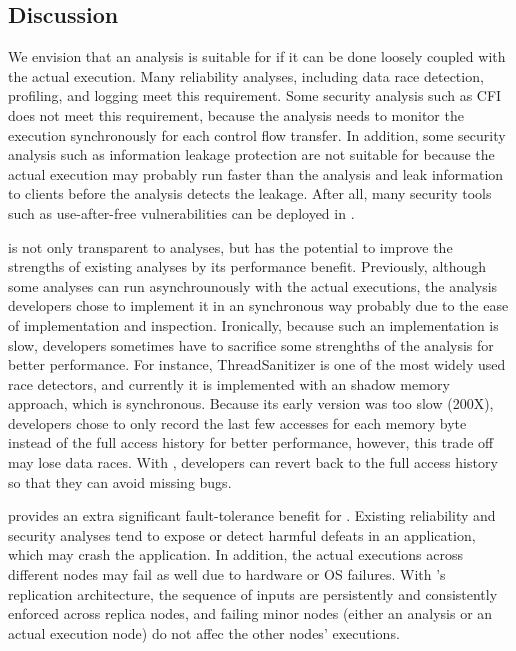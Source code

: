 
\subsection{Discussion} \label{sec:discuss}

We envision that an analysis is suitable for \xxx if it can be done loosely 
coupled with the actual execution. Many reliability analyses, including data 
race detection, profiling, and logging meet this requirement. Some security 
analysis such as CFI does not meet this requirement, because the analysis needs 
to monitor the execution synchronously for each control flow transfer. In 
addition, some security analysis such as information leakage protection are not 
suitable for \xxx because the actual execution may probably run faster than the 
analysis and leak information to clients before the analysis detects the 
leakage. After all, many security tools such as use-after-free vulnerabilities 
can be deployed in \xxx.

\xxx is not only transparent to analyses, but has the potential to improve the 
strengths of existing analyses by its performance benefit. Previously, although 
some analyses can run asynchrounously with the actual executions, the analysis 
developers chose to implement it in an synchronous way probably due to the ease 
of implementation and inspection. Ironically, because such an implementation is 
slow, developers sometimes have to sacrifice some strenghths of the analysis 
for better performance. For instance, ThreadSanitizer is one of the most widely 
used race detectors, and currently it is implemented with an shadow memory 
approach, which is synchronous. Because its early version was too slow (200X), 
developers chose to only record the last few accesses for each memory byte 
instead of the full access history for better performance, however, this trade 
off may lose data races. With \xxx, developers can revert back to the full 
access history so that they can avoid missing bugs.

\smr provides an extra significant fault-tolerance benefit for \xxx. Existing 
reliability and security analyses tend to expose or detect harmful defeats in 
an application, which may crash the application. In addition, the actual 
executions across different nodes may fail as well due to hardware or OS 
failures. With \xxx's \smr replication architecture, the sequence of inputs are 
persistently and consistently enforced across replica nodes, and failing minor 
nodes (either an analysis or an actual execution node) do not affec the other 
nodes' executions.
